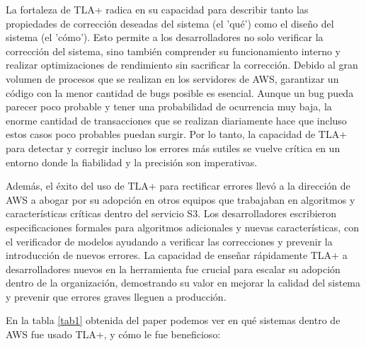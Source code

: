 \documentclass[runningheads]{llncs}
\begin{document}
La fortaleza de TLA+ radica en su capacidad para describir tanto las propiedades de corrección deseadas del sistema (el 'qué') como el diseño del sistema (el 'cómo'). Esto permite a los desarrolladores no solo verificar la corrección del sistema, sino también comprender su funcionamiento interno y realizar optimizaciones de rendimiento sin sacrificar la corrección. Debido al gran volumen de procesos que se realizan en los servidores de AWS, garantizar un código con la menor cantidad de bugs posible es esencial. Aunque un bug pueda parecer poco probable y tener una probabilidad de ocurrencia muy baja, la enorme cantidad de transacciones que se realizan diariamente hace que incluso estos casos poco probables puedan surgir. Por lo tanto, la capacidad de TLA+ para detectar y corregir incluso los errores más sutiles se vuelve crítica en un entorno donde la fiabilidad y la precisión son imperativas.

Además, el éxito del uso de TLA+ para rectificar errores llevó a la dirección de AWS a abogar por su adopción en otros equipos que trabajaban en algoritmos y características críticas dentro del servicio S3. Los desarrolladores escribieron especificaciones formales para algoritmos adicionales y nuevas características, con el verificador de modelos ayudando a verificar las correcciones y prevenir la introducción de nuevos errores. La capacidad de enseñar rápidamente TLA+ a desarrolladores nuevos en la herramienta fue crucial para escalar su adopción dentro de la organización, demostrando su valor en mejorar la calidad del sistema y prevenir que errores graves lleguen a producción.

En la tabla \ref{tab1} obtenida del paper podemos ver en qué sistemas dentro de AWS fue usado TLA+, y cómo le fue beneficioso:
\end{document}
